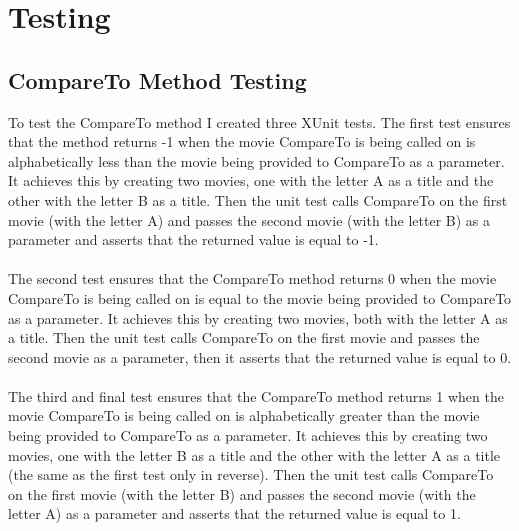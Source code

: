 \documentclass[12pt,a4paper]{article}
\begin{document}
		\newpage
	
	\section{Testing}
		\subsection{CompareTo Method Testing}
			To test the CompareTo method I created three XUnit tests. The first test 
			ensures that the method returns -1 when the movie CompareTo is being called 
			on is alphabetically less than the movie being provided to CompareTo as a 
			parameter. It achieves this by creating two movies, one with the letter A as 
			a title and the other with the letter B as a title. Then the unit test calls 
			CompareTo on the first movie (with the letter A) and passes the second movie 
			(with the letter B) as a parameter and asserts that the returned value is equal 
			to -1.\\
			\\
			The second test ensures that the CompareTo method returns 0 when the movie 
			CompareTo is being called on is equal to the movie being provided to CompareTo 
			as a parameter. It achieves this by creating two movies, both with the letter A 
			as a title. Then the unit test calls CompareTo on the first movie and passes the 
			second movie as a parameter, then it asserts that the returned value is equal to 
			0.\\
			\\
			The third and final test ensures that the CompareTo method returns 1 when the 
			movie CompareTo is being called on is alphabetically greater than the movie 
			being provided to CompareTo as a parameter. It achieves this by creating two 
			movies, one with the letter B as a title and the other with the letter A as a 
			title (the same as the first test only in reverse). Then the unit test calls 
			CompareTo on the first movie (with the letter B) and passes the second movie 
			(with the letter A) as a parameter and asserts that the returned value is equal 
			to 1.\\
			
		\newpage
\end{document}
